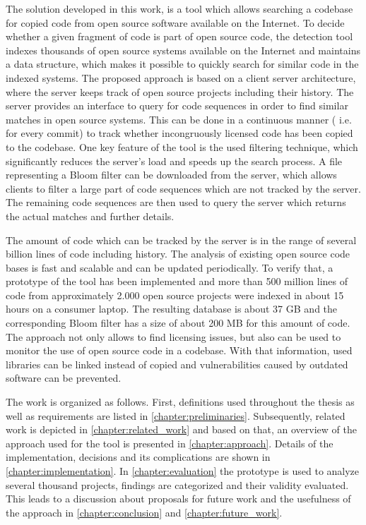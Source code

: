 The solution developed in this work, is a tool which allows searching a codebase for copied code from open source software available on the Internet.
To decide whether a given fragment of code is part of open source code, the detection tool indexes thousands of open source systems available on the Internet and maintains a data structure, which makes it possible to quickly search for similar code in the indexed systems.
The proposed approach is based on a client server architecture, where the server keeps track of open source projects including their history.
The server provides an interface to query for code sequences in order to find similar matches in open source systems.
This can be done in a continuous manner ( i.e. for every commit) to track whether incongruously licensed code has been copied to the codebase.
One key feature of the tool is the used filtering technique, which significantly reduces the server's load and speeds up the search process.
A file representing a Bloom filter can be downloaded from the server, which allows clients to filter a large part of code sequences which are not tracked by the server.
The remaining code sequences are then used to query the server which returns the actual matches and further details.

The amount of code which can be tracked by the server is in the range of several billion lines of code including history.
The analysis of existing open source code bases is fast and scalable and can be updated periodically.
To verify that, a prototype of the tool has been implemented and more than 500 million lines of code from approximately 2.000 open source projects were indexed in about 15 hours on a consumer laptop.
The resulting database is about 37 GB and the corresponding Bloom filter has a size of about 200 MB for this amount of code.
The approach not only allows to find licensing issues, but also can be used to monitor the use of open source code in a codebase.
With that information, used libraries can be linked instead of copied and vulnerabilities caused by outdated software can be prevented.

The work is organized as follows.
First, definitions used throughout the thesis as well as requirements are listed in \autoref{chapter:preliminaries}.
Subsequently, related work is depicted in \autoref{chapter:related_work} and based on that, an overview of the approach used for the tool is presented in \autoref{chapter:approach}.
Details of the implementation, decisions and its complications are shown in \autoref{chapter:implementation}.
In \autoref{chapter:evaluation} the prototype is used to analyze several thousand projects, findings are categorized and their validity evaluated.
This leads to a discussion about proposals for future work and the usefulness of the approach in \autoref{chapter:conclusion} and \autoref{chapter:future_work}.